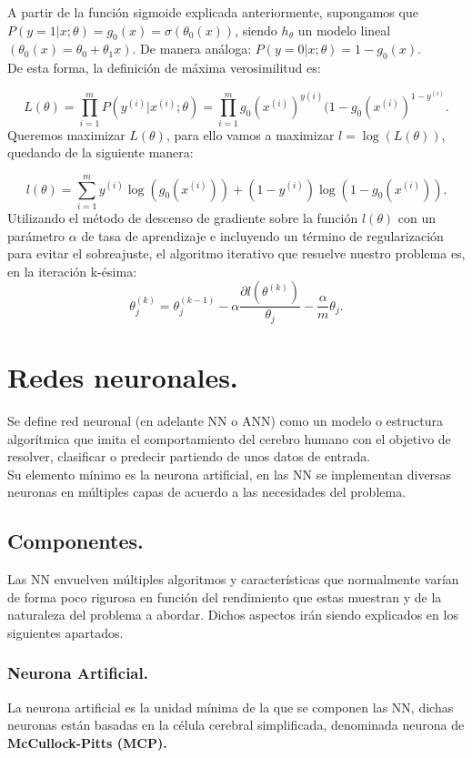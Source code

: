 \documentclass[a4paper,11pt]{article}
\begin{document}
\noindent
A partir de la función sigmoide explicada anteriormente,
supongamos que $P(y = 1 | x; \theta) = g_0(x) = \sigma(\theta_0(x))$, siendo $h_{\theta}$ un
modelo lineal $(\theta_0(x) = \theta_0 + \theta_1 x)$. De manera análoga:  $P(y = 0 | x; \theta) = 1-g_0(x)$.\\

\noindent
De esta forma, la definición de máxima verosimilitud es:

\[
L(\theta)=\prod_{i=1}^{m}P(y^{(i)}|x^{(i)};\theta)=\prod_{i=1}^{m}g_0(x^{(i)})^{y(i)}(1-g_0(x^{(i)})^{1-y^{(i)}}.
\]
Queremos maximizar $L(\theta)$,  para
ello vamos a maximizar $l = \log{(L(\theta))}$, quedando de la siguiente manera:

\[
l(\theta)=\sum_{i=1}^my^{(i)}\log{(g_0(x^{(i)}))}+(1-y^{(i)})\log{(1-g_0(x^{(i)}))}.
\]
Utilizando el método de descenso de gradiente sobre la función $l(\theta)$ con un
parámetro $\alpha$ de tasa de aprendizaje e incluyendo un término de regularización
para evitar el sobreajuste, el algoritmo iterativo que resuelve nuestro problema
es, en la iteración k-ésima:
\[
\theta_j^{(k)}=\theta_j^{(k-1)}-\alpha\frac{\partial l(\theta^{(k)})}{\theta_j}-\frac{\alpha}{m}\theta_j .
\]

\newpage
\section{Redes neuronales.}

Se define red neuronal (en adelante NN o ANN) como un modelo o estructura algorítmica que imita el comportamiento del cerebro humano con el objetivo de resolver, clasificar o predecir partiendo de unos datos de entrada.\\

\noindent
Su elemento mínimo es la neurona artificial, en las NN se implementan diversas neuronas en múltiples capas de acuerdo a las necesidades del problema.

\subsection{Componentes.}
Las NN envuelven múltiples algoritmos y características que normalmente varían de forma poco rigurosa en función del rendimiento que estas muestran y de la naturaleza del problema a abordar. Dichos aspectos irán siendo explicados en los siguientes apartados.
\subsubsection{Neurona Artificial.}
La neurona artificial es la unidad mínima de la que se componen las NN, dichas neuronas están basadas en la célula cerebral simplificada, denominada neurona de \textbf{McCullock-Pitts (MCP).}\\
\end{document}

